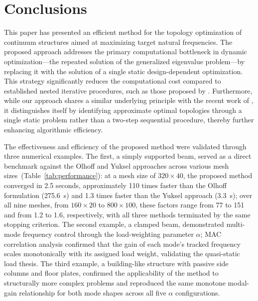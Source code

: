 \documentclass[applsci,article,submit,pdftex,moreauthors]{Definitions/mdpi}
\begin{document}
\section{Conclusions}

This paper has presented an efficient method for the topology optimization of continuum structures aimed at maximizing target natural frequencies. The proposed approach addresses the primary computational bottleneck in dynamic optimization—the repeated solution of the generalized eigenvalue problem—by replacing it with the solution of a single static design-dependent optimization. This strategy significantly reduces the computational cost compared to established nested iterative procedures, such as those proposed by \citet{DU2007}. Furthermore, while our approach shares a similar underlying principle with the recent work of \citet{YUKSEL2025}, it distinguishes itself by identifying approximate optimal topologies through a single static problem rather than a two-step sequential procedure, thereby further enhancing algorithmic efficiency.

The effectiveness and efficiency of the proposed method were validated through three numerical examples. The first, a simply supported beam, served as a direct benchmark against the Olhoff and Yuksel approaches across various mesh sizes~(Table~\ref{tab:performance}): at a mesh size of $320 \times 40$, the proposed method converged in 2.5 seconds, approximately 110 times faster than the Olhoff formulation (275.6~s) and 1.3 times faster than the Yuksel approach (3.3~s); over all nine meshes, from $160\times20$ to $800\times100$, these factors range from 77 to 151 and from 1.2 to 1.6, respectively, with all three methods terminated by the same stopping criterion. The second example, a clamped beam, demonstrated multi-mode frequency control through the load-weighting parameter $\alpha$; MAC correlation analysis confirmed that the gain of each mode's tracked frequency scales monotonically with its assigned load weight, validating the quasi-static load thesis. The third example, a building-like structure with passive side columns and floor plates, confirmed the applicability of the method to structurally more complex problems and reproduced the same monotone modal-gain relationship for both mode shapes across all five $\alpha$ configurations.
\end{document}
